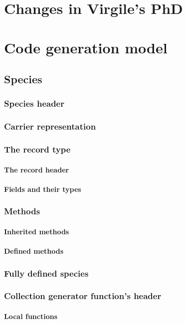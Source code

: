 \documentclass{book}
\begin{document}
\chapter{Changes in Virgile's PhD}


\chapter{Code generation model}
\section{Species}
\subsection{Species header}
\subsection{Carrier representation}
\subsection{The record type}
\subsubsection{The record header}
\subsubsection{Fields and their types}
\subsection{Methods}
\subsubsection{Inherited methods}
\subsubsection{Defined methods}
\subsection{Fully defined species}
\subsection{Collection generator function's header}
\subsubsection{Local functions}
\end{document}
